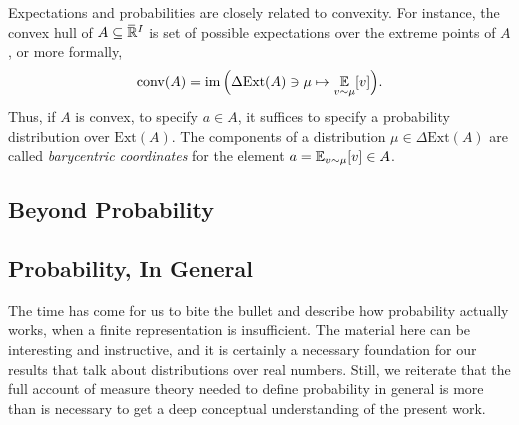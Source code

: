 Expectations and probabilities are closely related to convexity. 
For instance, 
the convex hull of $A \subseteq \mskip1mu\overline{\mskip-1mu\mathbb R\!}\,^I$ 
is set of possible expectations over the extreme points of $A$,
or more formally,
\[
    \mathrm{conv}(A) = \operatorname{\mathrm{im}} 
        \Big( \Delta \mathrm{Ext}(A) \ni \mu \mapsto \operatorname*{\mathbb{E}}_{v \sim \mu} [ v ] \Big).
\]
Thus, if $A$ is convex, to specify $a \in A$, it suffices to specify a probability distribution over $\mathrm{Ext}(A)$.  
The components of a distribution $\mu \in \Delta \mathrm{Ext}(A)$ are called \emph{barycentric coordinates} for the element $a = \operatorname*{\mathbb{E}}_{v \sim \mu}[v] \in A$.



% 

\subsection{Beyond Probability}
    \label{ssec:beyond-prob}


\subsection{Probability, In General}
    \label{ssec:gen-prob}

The time has come for us to bite the bullet and describe how probability actually works, when a finite representation is insufficient. 
The material here can be interesting and instructive,
    and it is certainly a necessary foundation for our results that talk about distributions over real numbers.
Still, we reiterate that the full account of measure theory needed to define probability in general is more than is necessary to get a deep conceptual understanding of the present work. 

